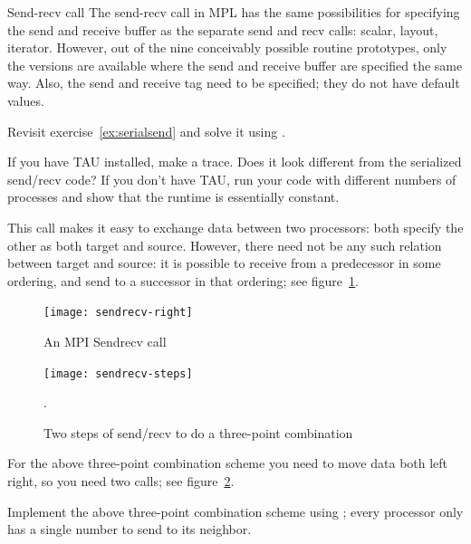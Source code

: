 \begin{mplnote}{Send-recv call}
  The send-recv call in \ac{MPL} has the same possibilities
  for specifying the send and receive buffer as the separate send and recv calls:
  scalar, layout, iterator. However, out of the nine conceivably possible
  routine prototypes, only the versions are available where the send and receive buffer
  are specified the same way.
  Also, the send and receive tag need to be specified; they do not have default values.

\end{mplnote}

\begin{exercise}
  \label{ex:rightsendrecv}
  Revisit exercise~\ref{ex:serialsend} and solve it using
  .

  If you have TAU installed, make a trace. Does it look different
  from the serialized send/recv code? If you don't have TAU, run your
  code with different numbers of processes and show that the runtime
  is essentially constant.
\end{exercise}

This call makes it easy to exchange data between two processors: both
specify the other as both target and source. However, there need not
be any such relation between target and source: it is possible to
receive from a predecessor in some ordering, and send to a successor
in that ordering; see figure~\ref{fig:sendrecv}.

\begin{figure}[ht]
  \texttt{[image: sendrecv-right]}
  \caption{An MPI Sendrecv call}
  \label{fig:sendrecv}
\end{figure}

\begin{figure}[ht]
  \texttt{[image: sendrecv-steps]}
  \caption{Two steps of send/recv to do a three-point combination}
  \label{fig:sendrecv-steps}.
\end{figure}

For the above three-point combination scheme you need to move data
both left right, so you need two  calls;
see figure~\ref{fig:sendrecv-steps}.

\begin{exercise}
  \label{ex:3ptsendrecv}
  Implement the above three-point combination scheme using ;
  every processor only has a single number to send to its neighbor.
\end{exercise}

